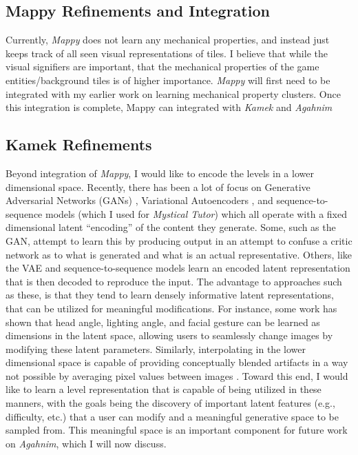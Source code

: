 \documentclass[12pt]{report}
\begin{document}
\subsection*{Mappy Refinements and Integration}

 Currently, \textit{Mappy} does not learn any mechanical properties, and instead just keeps track of all seen visual representations of tiles.  I believe that while the visual signifiers are important, that the mechanical properties of the game entities/background tiles is of higher importance. \textit{Mappy} will first need to be integrated with my earlier work on learning mechanical property clusters. Once this integration is complete, Mappy can integrated with \textit{Kamek} and \textit{Agahnim}

\subsection*{Kamek Refinements}

Beyond integration of \textit{Mappy}, 
I would like to encode the levels in a lower dimensional space.  Recently, there has been a lot of focus on Generative Adversarial Networks (GANs) \cite{gans}, Variational Autoencoders \cite{vae}, and sequence-to-sequence models \cite{seq2seq} (which I used for \textit{Mystical Tutor}) which all operate with a fixed dimensional latent ``encoding'' of the content they generate.  Some, such as the GAN, attempt to learn this by producing output in an attempt to confuse a critic network as to what is generated and what is an actual representative. Others, like the VAE and sequence-to-sequence models learn an encoded latent representation that is then decoded to reproduce the input.  The advantage to approaches such as these, is that they tend to learn densely informative latent representations, that can be utilized for meaningful modifications.  For instance, some work has shown that head angle, lighting angle, and facial gesture \cite{ganstuff} can be learned as dimensions in the latent space, allowing users to seamlessly change images by modifying these latent parameters.  Similarly, interpolating in the lower dimensional space is capable of providing conceptually blended artifacts in a way not possible by averaging pixel values between images \cite{ganinterpolation}.  Toward this end, I would like to learn a level representation that is capable of being utilized in these manners, with the goals being the discovery of important latent features (e.g., difficulty, etc.) that a user can modify and a meaningful generative space to be sampled from.  This meaningful space is an important component for future work on \textit{Agahnim}, which I will now discuss.
\end{document}
